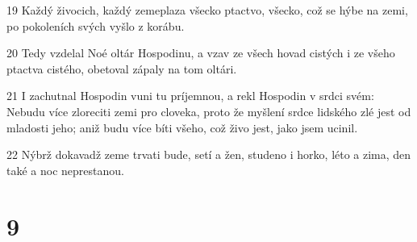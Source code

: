 \par 19 Každý živocich, každý zemeplaza všecko ptactvo, všecko, což se hýbe na zemi, po pokoleních svých vyšlo z korábu.
\par 20 Tedy vzdelal Noé oltár Hospodinu, a vzav ze všech hovad cistých i ze všeho ptactva cistého, obetoval zápaly na tom oltári.
\par 21 I zachutnal Hospodin vuni tu príjemnou, a rekl Hospodin v srdci svém: Nebudu více zloreciti zemi pro cloveka, proto že myšlení srdce lidského zlé jest od mladosti jeho; aniž budu více bíti všeho, což živo jest, jako jsem ucinil.
\par 22 Nýbrž dokavadž zeme trvati bude, setí a žen, studeno i horko, léto a zima, den také a noc neprestanou.

\chapter{9}

